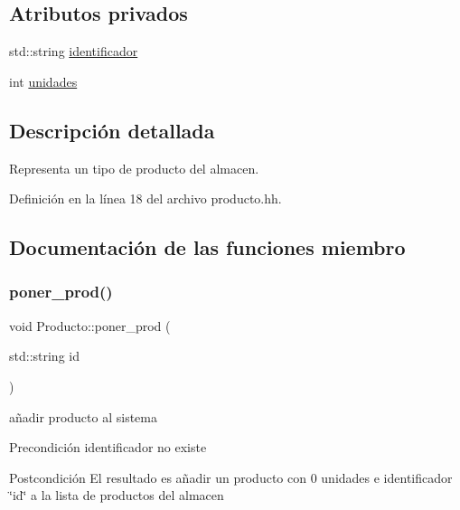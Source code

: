 \subsection*{Atributos privados}
\begin{DoxyCompactItemize}
\item 
std\+::string \mbox{\hyperlink{class_producto_a522892e64ad72444f1976ae86b2c2816}{identificador}}
\item 
int \mbox{\hyperlink{class_producto_a391646f51e9bbbd3cf22abdbd74eaac6}{unidades}}
\end{DoxyCompactItemize}


\subsection{Descripción detallada}
Representa un tipo de producto del almacen. 

Definición en la línea 18 del archivo producto.\+hh.



\subsection{Documentación de las funciones miembro}
\mbox{\label{class_producto_aef5383f676b625125d6d4a754e457af3}} 
\subsubsection{\texorpdfstring{poner\+\_\+prod()}{poner\_prod()}}
{\footnotesize\ttfamily void Producto\+::poner\+\_\+prod (\begin{DoxyParamCaption}\item[{std\+::string}]{id }\end{DoxyParamCaption})}



añadir producto al sistema 

\begin{DoxyPrecond}{Precondición}
identificador no existe 
\end{DoxyPrecond}
\begin{DoxyPostcond}{Postcondición}
El resultado es añadir un producto con 0 unidades e identificador \char`\"{}id\char`\"{} a la lista de productos del almacen 
\end{DoxyPostcond}
\mbox{\label{class_producto_ac6a7f69acbcde467e09feccbd3a7af57}} 
